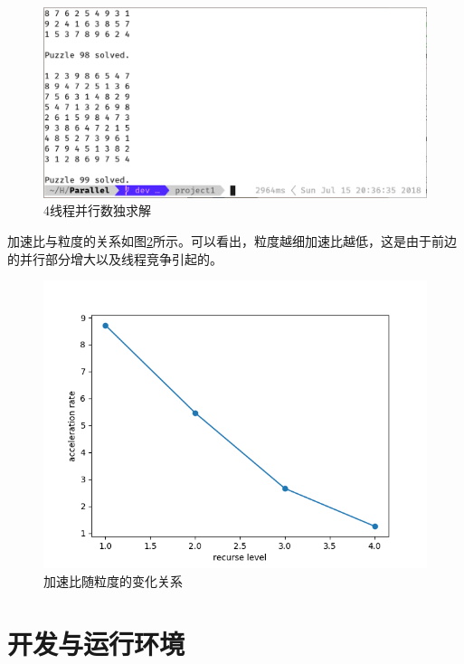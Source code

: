 \documentclass{report}
\begin{document}
\begin{figure}[htbp]
    \centering
    \includegraphics[width=0.9\linewidth]{sudoParallel.png}
    \caption{4线程并行数独求解}
    \label{fig:sudoParallel}
\end{figure}
\par 加速比与粒度的关系如图\ref{fig:sudoTrend}所示。可以看出，粒度越细加速比越低，这是由于前边的并行部分增大以及线程竞争引起的。

\begin{figure}[htbp]
    \centering
    \includegraphics[width=0.8\linewidth]{sudoTrend.png}
    \caption{加速比随粒度的变化关系}
    \label{fig:sudoTrend}
\end{figure}

\appendix
\chapter{开发与运行环境}
\label{cha:env}
\end{document}
